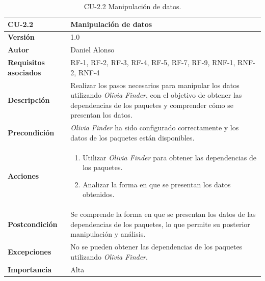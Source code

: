 \begin{table}[p]
	\centering
	\begin{tabularx}{\linewidth}{ p{} p{} }
		\toprule
		\textbf{CU-2.2}               & \textbf{Manipulación de datos}                                                      \\
		\toprule
		\textbf{Versión}              & 1.0                                                                                 \\
		\textbf{Autor}                & Daniel Alonso                                                                       \\
		\textbf{Requisitos asociados} & RF-1, RF-2, RF-3, RF-4, RF-5, RF-7, RF-9, RNF-1, RNF-2, RNF-4                       \\
		\textbf{Descripción}          & Realizar los pasos necesarios para manipular los datos
		utilizando \textit{Olivia Finder}, con el objetivo de obtener las dependencias de los
		paquetes y comprender cómo se presentan los datos.                                                                  \\
		\textbf{Precondición}         & \textit{Olivia Finder} ha sido configurado correctamente y los datos
		de los paquetes están disponibles.                                                                                  \\
		\textbf{Acciones}             & \begin{enumerate}
			                                \item Utilizar \textit{Olivia Finder} para obtener las dependencias de los paquetes.
			                                \item Analizar la forma en que se presentan los datos obtenidos.
		                                \end{enumerate} \\
		\textbf{Postcondición}        & Se comprende la forma en que se presentan los datos de las
		dependencias de los paquetes, lo que permite su posterior manipulación y análisis.                                  \\
		\textbf{Excepciones}          & No se pueden obtener las dependencias de los paquetes
		utilizando \textit{Olivia Finder}.                                                                                  \\
		\textbf{Importancia}          & Alta                                                                                \\
		\bottomrule
	\end{tabularx}
	\caption{CU-2.2 Manipulación de datos.}
	\label{tab:cu2.2}
\end{table}

